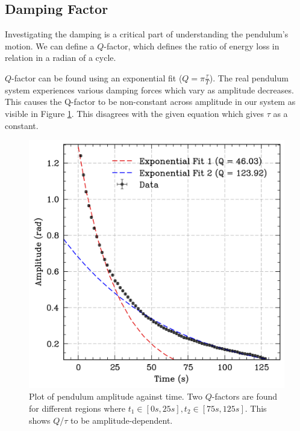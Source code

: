 \documentclass[prl,twocolumn,amsmath,amssymb,superscriptaddress]{revtex4-2}
\begin{document}
\subsection{Damping Factor}

Investigating the damping is a critical part of understanding the pendulum's motion. We can define a $Q$-factor, which defines the ratio of energy loss in relation in a radian of a cycle.

$Q$-factor can be found using an exponential fit ($Q=\pi\frac{\tau}{T}$). The real pendulum system experiences various damping forces which vary as amplitude decreases. This causes the Q-factor to be non-constant across amplitude in our system as visible in Figure \ref{fig:decay}. This disagrees with the given equation which gives $\tau$ as a constant.

\begin{figure}[htb]
    \hspace{-20pt}
    \includegraphics[width=0.8\linewidth]{decay.png}
    \caption{Plot of pendulum amplitude against time. Two $Q$-factors are found for different regions where $t_1\in[0s,25s], t_2\in[75s,125s]$. This shows $Q$/$\tau$ to be amplitude-dependent.}
    \label{fig:decay}
\end{figure}
\end{document}
